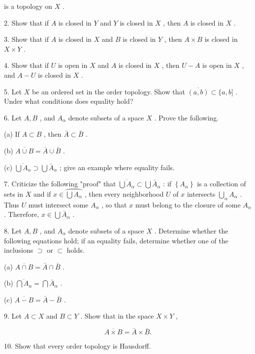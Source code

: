 is a topology on \(X\) .

2. Show that if \(A\) is closed in \(Y\) and \(Y\) is closed in \(X\) , then \(A\) is closed in \(X\) .

3. Show that if \(A\) is closed in \(X\) and \(B\) is closed in \(Y\) , then \(A \times  B\) is closed in \(X \times  Y\) .

4. Show that if \(U\) is open in \(X\) and \(A\) is closed in \(X\) , then \(U - A\) is open in \(X\) , and \(A - U\) is closed in \(X\) .

5. Let \(X\) be an ordered set in the order topology. Show that \(\overline{\left( a,b\right) } \subset  \{ a,b\rbrack\) . Under what conditions does equality hold?

6. Let \(A,B\) , and \({A}_{\alpha }\) denote subsets of a space \(X\) . Prove the following.

(a) If \(A \subset  B\) , then \(\bar{A} \subset  \bar{B}\) .

(b) \(\overline{A \cup  B} = \bar{A} \cup  \bar{B}\) .

(c) \(\overline{\bigcup {A}_{\alpha }} \supset  \bigcup {\bar{A}}_{\alpha }\) ; give an example where equality fails.

7. Criticize the following "proof" that \(\overline{\bigcup {A}_{\alpha }} \subset  \bigcup {\bar{A}}_{\alpha }\) : if \(\left\{  {A}_{\alpha }\right\}\) is a collection of sets in \(X\) and if \(x \in  \overset{⏜}{\bigcup {A}_{\alpha }}\) , then every neighborhood \(U\) of \(x\) intersects \(\mathop{\bigcup }\limits_{\alpha }{A}_{\alpha }\) . Thus \(U\) must intersect some \({A}_{\alpha }\) , so that \(x\) must belong to the closure of some \({A}_{\alpha }\) . Therefore, \(x \in  \bigcup {\bar{A}}_{\alpha }\) .

8. Let \(A,B\) , and \({A}_{\alpha }\) denote subsets of a space \(X\) . Determine whether the following equations hold; if an equality fails, determine whether one of the inclusions \(\supset\) or \(\subset\) holds.

(a) \(\overline{A \cap  B} = \bar{A} \cap  \bar{B}\) .

(b) \(\overline{\bigcap {A}_{\alpha }} = \bigcap {\bar{A}}_{\alpha }\) .

(c) \(\overline{A - B} = \bar{A} - \bar{B}\) .

9. Let \(A \subset  X\) and \(B \subset  Y\) . Show that in the space \(X \times  Y\) ,

\[
\overline{A \times  B} = \bar{A} \times  \bar{B}.
\]

10. Show that every order topology is Hausdorff.

